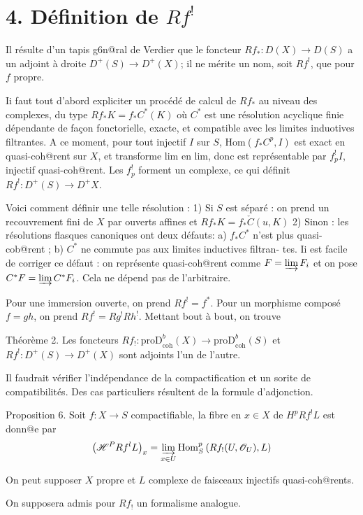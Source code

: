 \documentclass[12pt]{article}
\begin{document}
\section{4. Définition de $Rf^{!}$}
Il résulte d'un tapis g6n@ral de Verdier que le foncteur $Rf_{*}: D(X) \to D(S)$ a un adjoint à droite $D^{+}(S) \to D^{+}(X)$; il ne mérite un nom, soit $Rf^{!}$, que pour $f$ propre.

Ii faut tout d'abord expliciter un procédé de calcul de $Rf_{*}$ au niveau des complexes, du type $R f_{*} K=f_{*} C^{*}(K)$ où $C^{*}$ est une résolution acyclique finie dépendante de façon fonctorielle, exacte, et compatible avec les limites induotives filtrantes.
A ce moment, pour tout injectif $I$ sur $S$, $\mathrm{Hom}(f_{*} C^{p},I)$ est exact en quasi-coh@rent sur $X$, et transforme lim en lim, donc est représentable par $f_{p}^{!} I$, injectif quasi-coh@rent.
Les $f_{p}^{!}$ forment un complexe, ce qui définit $Rf^{!}: D^{+}(S) \to D^{+}X$.

Voici comment définir une telle résolution :
1) Si $S$ est séparé : on prend un recouvrement fini de $X$ par ouverts affines et $R f_{*} K=f_{*} \check{C}(u,K)$
2) Sinon : les résolutions flasques canoniques ont deux défauts: a) $f_{*} C^{*}$ n'est plus quasi-cob@rent ;
b) $C^{*}$ ne commute pas aux limites inductives filtran- tes.
Ii est facile de corriger ce défaut : on représente quasi-coh@rent comme $F=\varinjlim F_i$ et on pose $C^{*}F=\varinjlim C^{*}F_i$.
Cela ne dépend pas de l'arbitraire.

Pour une immersion ouverte, on prend $R f^{!}=f^{*}$.
Pour un morphisme composé $f=gh$, on prend $Rf^{!}=Rg^{!}Rh^{!}$.
Mettant bout à bout, on trouve

Théorème 2. Les foncteurs $Rf_{!}: \mathrm{proD}_{\mathrm{coh}}^{b}(X) \to \mathrm{proD}_{\mathrm{coh}}^{b}(S)$ et $Rf^{!}: D^{+}(S) \to D^{+}(X)$ sont adjoints l'un de l'autre.

Il faudrait vérifier l'indépendance de la compactification et un sorite de compatibilités.
Des cas particuliers résultent de la formule d'adjonction.

Proposition 6. Soit $f: X \to S$ compactifiable, la fibre en $x \in X$ de $H^{p}Rf^{!}L$ est donn@e par
\[\left(\mathscr{H}^{P} R f^{l} L\right)_{x}=\varinjlim_{x\in U} \mathrm{Hom}_{S}^{p}\left(R f_{!}(U, \mathscr{O}_{U}), L\right)\]

On peut supposer $X$ propre et $L$ complexe de faisceaux injectifs quasi-coh@rents.

On supposera admis pour $Rf_{!}$ un formalisme analogue.
\end{document}
